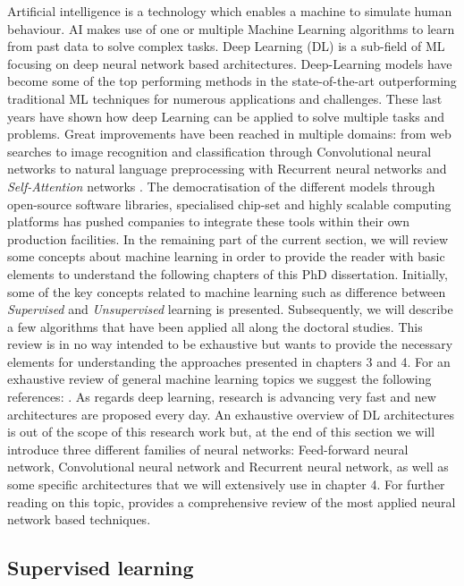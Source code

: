 Artificial intelligence is a technology which enables a machine to simulate human behaviour. AI makes use of one or multiple Machine Learning algorithms to learn from past data to solve complex tasks. Deep Learning (DL) is a sub-field of ML focusing on deep neural network based architectures. Deep-Learning models have become some of the top performing methods in the state-of-the-art outperforming traditional ML techniques for numerous applications and challenges. These last years have shown how deep Learning can be applied to solve multiple tasks and problems. Great improvements have been reached in multiple domains: from web searches to image recognition and classification through Convolutional neural networks to natural language preprocessing with Recurrent neural networks and \textit{Self-Attention} networks \citep{vaswani2017attention}. The democratisation of the different models through open-source software libraries, specialised chip-set and highly scalable computing platforms has pushed companies to integrate these tools within their own production facilities. 
In the remaining part of the current section, we will review some concepts about machine learning in order to provide the reader with basic elements to understand the following chapters of this PhD dissertation. Initially, some of the key concepts related to machine learning such as difference between \textit{Supervised} and \textit{Unsupervised} learning is presented. Subsequently, we will describe a few algorithms that have been applied all along the doctoral studies. This review is in no way intended to be exhaustive but wants to provide the necessary elements for understanding the approaches presented in chapters 3 and 4. For an exhaustive review of general machine learning topics we suggest the following references: \citep{bishop2006pattern,friedman2017elements}. As regards deep learning, research is advancing very fast and new architectures are proposed every day. An exhaustive overview of DL architectures is out of the scope of this research work but, at the end of this section we will introduce three different families of neural networks: Feed-forward neural network, Convolutional neural network and Recurrent neural network, as well as some specific architectures that we will extensively use in chapter 4. For further reading on this topic, \citep{goodfellow2016deep} provides a comprehensive review of the most applied neural network based techniques. 



\subsection{Supervised learning}

